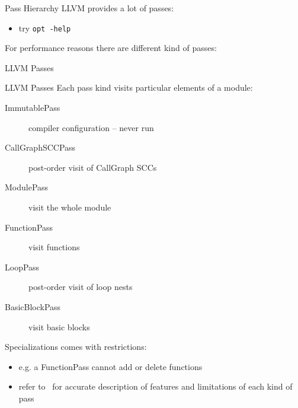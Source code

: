 \documentclass[10pt,mathserif]{beamer}
\begin{document}
\begin{frame}{Pass Hierarchy}
LLVM provides a lot of passes:

\begin{itemize}
\item try \texttt{\smaller opt -help}
\end{itemize}

For performance reasons there are different kind of passes:

\begin{block}{LLVM Passes}

\centering
\end{block}
\end{frame}

\begin{frame}{LLVM Passes}
Each pass kind visits particular elements of a module:

\begin{description}
\item[ImmutablePass] compiler configuration -- never run
\item[CallGraphSCCPass] post-order visit of CallGraph SCCs
\item[ModulePass] visit the whole module
\item[FunctionPass] visit functions
\item[LoopPass] post-order visit of loop nests
\item[BasicBlockPass] visit basic blocks
\end{description}

Specializations comes with restrictions:

\begin{itemize}
\item e.g. a \alert{FunctionPass} cannot add or delete functions
\item refer to~\cite{LOCAL:www/llvmWritingAPass} for accurate description of
      features and limitations of each kind of pass
\end{itemize}
\end{frame}

%
%
%
%
\end{document}
